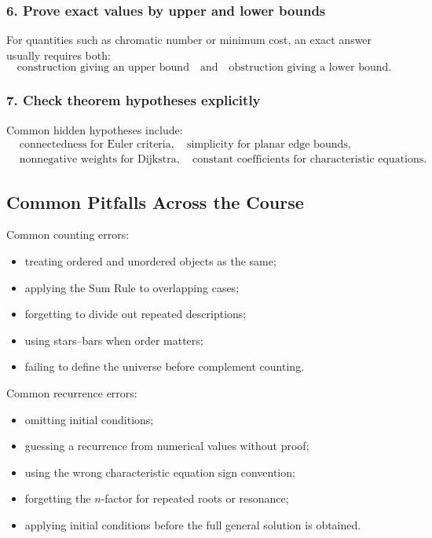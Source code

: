 \subsubsection*{6. Prove exact values by upper and lower bounds}
For quantities such as chromatic number or minimum cost, an exact answer usually requires both:
\[
\text{construction giving an upper bound}
\quad\text{and}\quad
\text{obstruction giving a lower bound}.
\]

\subsubsection*{7. Check theorem hypotheses explicitly}
Common hidden hypotheses include:
\[
\begin{aligned}
&\text{connectedness for Euler criteria},\quad
\text{simplicity for planar edge bounds},\\
&\text{nonnegative weights for Dijkstra},\quad
\text{constant coefficients for characteristic equations}.
\end{aligned}
\]

\subsection{Common Pitfalls Across the Course}

\begin{commonmistake}[title={Counting pitfalls}]
Common counting errors:
\begin{itemize}[leftmargin=*]
    \item treating ordered and unordered objects as the same;
    \item applying the Sum Rule to overlapping cases;
    \item forgetting to divide out repeated descriptions;
    \item using stars--bars when order matters;
    \item failing to define the universe before complement counting.
\end{itemize}
\end{commonmistake}

\begin{commonmistake}[title={Recurrence pitfalls}]
Common recurrence errors:
\begin{itemize}[leftmargin=*]
    \item omitting initial conditions;
    \item guessing a recurrence from numerical values without proof;
    \item using the wrong characteristic equation sign convention;
    \item forgetting the \(n\)-factor for repeated roots or resonance;
    \item applying initial conditions before the full general solution is obtained.
\end{itemize}
\end{commonmistake}

